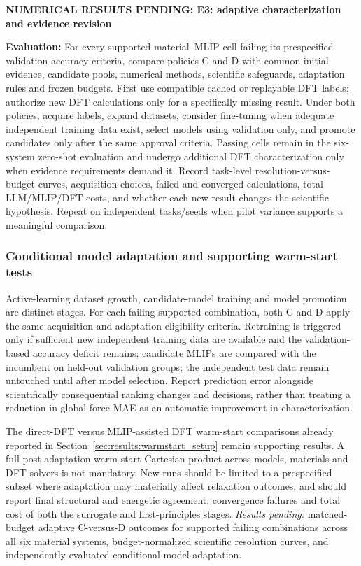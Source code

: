 \documentclass[11pt,a4paper]{article}
\newcommand{\newexperiment}[2]{\par\medskip\noindent\begingroup\color{red!80!black}\textbf{NUMERICAL RESULTS PENDING: #1}\par\noindent\textbf{Evaluation:} #2\par\endgroup\medskip}
\begin{document}
\newexperiment{E3: adaptive characterization and evidence revision}{For every supported material--MLIP cell failing its prespecified validation-accuracy criteria, compare policies C and D with common initial evidence, candidate pools, numerical methods, scientific safeguards, adaptation rules and frozen budgets. First use compatible cached or replayable DFT labels; authorize new DFT calculations only for a specifically missing result. Under both policies, acquire labels, expand datasets, consider fine-tuning when adequate independent training data exist, select models using validation only, and promote candidates only after the same approval criteria. Passing cells remain in the six-system zero-shot evaluation and undergo additional DFT characterization only when evidence requirements demand it. Record task-level resolution-versus-budget curves, acquisition choices, failed and converged calculations, total LLM/MLIP/DFT costs, and whether each new result changes the scientific hypothesis. Repeat on independent tasks/seeds when pilot variance supports a meaningful comparison.}

\subsubsection{Conditional model adaptation and supporting warm-start tests}
Active-learning dataset growth, candidate-model training and model promotion are distinct stages. For each failing supported combination, both C and D apply the same acquisition and adaptation eligibility criteria. Retraining is triggered only if sufficient new independent training data are available and the validation-based accuracy deficit remains; candidate MLIPs are compared with the incumbent on held-out validation groups; the independent test data remain untouched until after model selection. Report prediction error alongside scientifically consequential ranking changes and decisions, rather than treating a reduction in global force MAE as an automatic improvement in characterization.

The direct-DFT versus MLIP-assisted DFT warm-start comparisons already reported in Section~\ref{sec:results:warmstart_setup} remain supporting results. A full post-adaptation warm-start Cartesian product across models, materials and DFT solvers is not mandatory. New runs should be limited to a prespecified subset where adaptation may materially affect relaxation outcomes, and should report final structural and energetic agreement, convergence failures and total cost of both the surrogate and first-principles stages.
\textcolor{red!80!black}{\emph{Results pending:} matched-budget adaptive C-versus-D outcomes for supported failing combinations across all six material systems, budget-normalized scientific resolution curves, and independently evaluated conditional model adaptation.}
\end{document}
